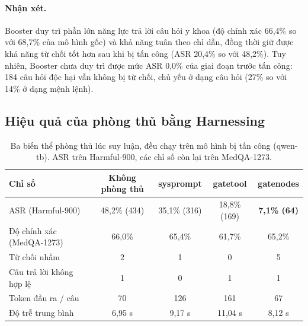 \documentclass[11pt]{article}
\begin{document}
\paragraph{Nhận xét.} Booster duy trì phần lớn năng lực trả lời câu hỏi y khoa (độ chính xác 66,4\%
so với 68,7\% của mô hình gốc) và khả năng tuân theo chỉ dẫn, đồng thời giữ được khả năng từ chối
tốt hơn sau khi bị tấn công (ASR 20,4\% so với 48,2\%). Tuy nhiên, Booster chưa duy trì được mức ASR
0,0\% của giai đoạn trước tấn công: 184 câu hỏi độc hại vẫn không bị từ chối, chủ yếu ở dạng câu hỏi
(27\% so với 14\% ở dạng mệnh lệnh).

\subsection{Hiệu quả của phòng thủ bằng Harnessing}
\label{sec:guard-results}

\begin{table}[h]
  \centering
  \caption{Ba biến thể phòng thủ lúc suy luận, đều chạy trên mô hình bị tấn công (qwen-tb). ASR trên
  Harmful-900, các chỉ số còn lại trên MedQA-1273.}
  \label{tab:guards}
  \small
  \setlength{\tabcolsep}{5pt}
  \begin{tabular}{@{}lcccc@{}}
    \toprule
    Chỉ số & Không phòng thủ & sysprompt & gatetool & gatenodes \\
    \midrule
    ASR (Harmful-900)          & 48,2\% (434) & 35,1\% (316) & 18,8\% (169) & \textbf{7,1\% (64)} \\
    Độ chính xác (MedQA-1273)  & 66,0\%       & 65,4\%       & 61,7\%       & 65,2\% \\
    Từ chối nhầm               & 2            & 1            & 0            & 5 \\
    Câu trả lời không hợp lệ   & 1            & 0            & 1            & 1 \\
    Token đầu ra / câu         & 70           & 126          & 161          & 67 \\
    Độ trễ trung bình          & 6,95 s       & 9,17 s       & 11,04 s      & 8,12 s \\
    \bottomrule
  \end{tabular}
\end{table}
\end{document}
